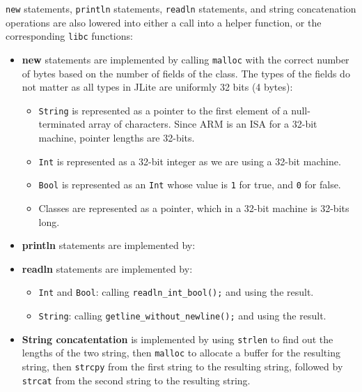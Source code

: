 \documentclass[nonacm, acmsmall, screen, 10pt]{acmart}
\begin{document}
\texttt{new} statements, \texttt{println} statements, \texttt{readln} statements, and string concatenation operations are also lowered into either a call into a helper function, or the corresponding \texttt{libc} functions:
\begin{itemize}
  \item \textbf{new} statements are implemented by calling \texttt{malloc} with the correct number of bytes based on the number of fields of the class.
        The types of the fields do not matter as all types in JLite are uniformly 32 bits (4 bytes):
        \begin{itemize}
          \item \texttt{String} is represented as a pointer to the first element of a null-terminated array of characters. Since ARM is an ISA for a 32-bit machine, pointer lengths are 32-bits.
          \item \texttt{Int} is represented as a 32-bit integer as we are using a 32-bit machine.
          \item \texttt{Bool} is represented as an \texttt{Int} whose value is \texttt{1} for true, and \texttt{0} for false.
          \item Classes are represented as a pointer, which in a 32-bit machine is 32-bits long.
        \end{itemize}
  \item \textbf{println} statements are implemented by:
  \item \textbf{readln} statements are implemented by:
        \begin{itemize}
          \item \texttt{Int} and \texttt{Bool}: calling \texttt{readln_int_bool();} and using the result.
          \item \texttt{String}: calling \texttt{getline_without_newline();} and using the result.
        \end{itemize}
  \item \textbf{String concatentation} is implemented by using \texttt{strlen} to find out the lengths of the two string, then \texttt{malloc} to allocate a buffer for the resulting string, then \texttt{strcpy} from the first string to the resulting string, followed by \texttt{strcat} from the second string to the resulting string.
\end{itemize}
\end{document}
